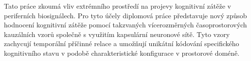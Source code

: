 Tato práce zkoumá vliv extrémního prostředí na projevy kognitivní zátěže v
periferních biosignálech. Pro tyto účely diplomová práce představuje nový způsob
hodnocení kognitivní zátěže pomocí takzvaných vícerozměrných časoprostorových
kauzálních vzorů společně s využitím kapsulární neuronové sítě. Tyto vzory
zachycují temporální příčinné relace a umožňují unikátní kódování specifického
kognitivního stavu v podobě charakteristické konfigurace v prostorové doméně.



